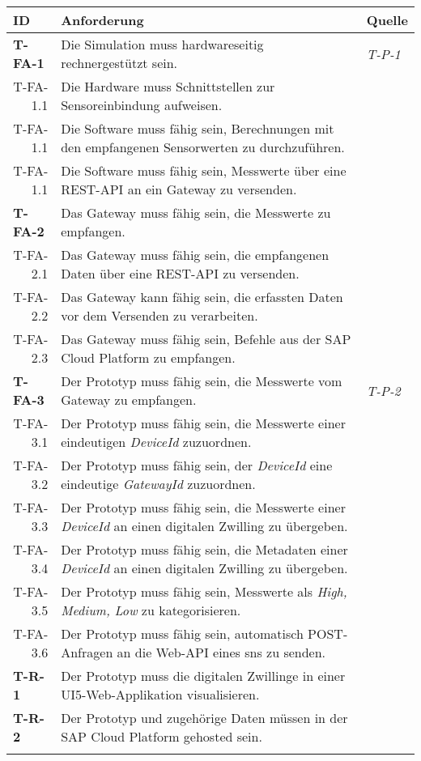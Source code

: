   \begin{tabularx}{\textwidth}{@{}lXp{1.5cm}@{}}
      \toprule
      ID                & Anforderung & Quelle \\
      \midrule
      \endhead
      \textbf{T-FA-1}              &    Die Simulation muss hardwareseitig rechnergestützt sein.       & \textit{T-P-1}                \\
      \multicolumn{1}{r}{T-FA-1.1} &   Die Hardware muss Schnittstellen zur Sensoreinbindung aufweisen. \\
      \multicolumn{1}{r}{T-FA-1.1} &   Die Software muss fähig sein, Berechnungen mit den empfangenen Sensorwerten zu durchzuführen. \\
      \multicolumn{1}{r}{T-FA-1.1} &   Die Software muss fähig sein, Messwerte über eine REST-API an ein Gateway zu versenden. \\
      \textbf{T-FA-2}              &   Das Gateway muss fähig sein, die Messwerte zu empfangen.   \\
      \multicolumn{1}{r}{T-FA-2.1}     &   Das Gateway muss fähig sein, die empfangenen Daten über eine REST-API zu versenden.   \\
      \multicolumn{1}{r}{T-FA-2.2} & Das Gateway kann fähig sein, die erfassten Daten vor dem Versenden zu verarbeiten. \\
      \multicolumn{1}{r}{T-FA-2.3} & Das Gateway muss fähig sein, Befehle aus der SAP Cloud Platform zu empfangen. \\
      \textbf{T-FA-3}            &      Der Prototyp muss fähig sein, die Messwerte vom Gateway zu empfangen. &    \textit{T-P-2}    \\
      \multicolumn{1}{r}{T-FA-3.1}    &  Der Prototyp muss fähig sein, die Messwerte einer eindeutigen \textit{DeviceId} zuzuordnen. \\
      \multicolumn{1}{r}{T-FA-3.2}    &  Der Prototyp muss fähig sein, der \textit{DeviceId} eine eindeutige \textit{GatewayId} zuzuordnen. \\
      \multicolumn{1}{r}{T-FA-3.3}    &  Der Prototyp muss fähig sein, die Messwerte einer \textit{DeviceId} an einen digitalen Zwilling zu übergeben.\\
      \multicolumn{1}{r}{T-FA-3.4}    &  Der Prototyp muss fähig sein, die Metadaten einer \textit{DeviceId} an einen digitalen Zwilling zu übergeben. \\
      \multicolumn{1}{r}{T-FA-3.5}  &  Der Prototyp muss fähig sein, Messwerte als \textit{High, Medium, Low} zu kategorisieren. \\
      \multicolumn{1}{r}{T-FA-3.6}  &  Der Prototyp muss fähig sein, automatisch POST-Anfragen an die Web-API eines \ac{sns} zu senden.  \\
      \textbf{T-R-1} & Der Prototyp muss die digitalen Zwillinge in einer UI5-Web-Applikation visualisieren. \\
      \textbf{T-R-2} & Der Prototyp und zugehörige Daten müssen in der SAP Cloud Platform gehosted sein.  \\
      \addlinespace
      \bottomrule
      \caption{Anforderungen aus technischer Ebene}
      \label{technik_anforderung}
  \end{tabularx}

  \newpage


